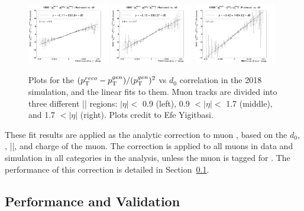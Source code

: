 \begin{figure}[!htb]
      \centering
      \includegraphics[width=0.32\textwidth]{pics/muon_corr/GeoFit/fit_results/2018_DY_eta_0_0p9_dRelPt2p0_Roch.png}
      \includegraphics[width=0.32\textwidth]{pics/muon_corr/GeoFit/fit_results/2018_DY_eta_0p9_1p7_dRelPt2p0_Roch.png}
      \includegraphics[width=0.32\textwidth]{pics/muon_corr/GeoFit/fit_results/2018_DY_eta_1p7_inf_dRelPt2p0_Roch.png}
      \caption{Plots for the $(p_{\mathrm{T}}^{reco}-p_{\mathrm{T}}^{gen})/ (p_{\mathrm{T}}^{gen})^{2}$ vs $d_0$ correlation in the 2018 \DY simulation, 
               and the linear fits to them. Muon tracks are divided into three different |\eta| regions:
               $|\eta| <$ 0.9 (left), 0.9 $< |\eta| <$ 1.7 (middle), and 1.7 $< |\eta|$ (right).
               Plots credit to Efe Yigitbasi.}
      \label{fig:geofit_param_2018}
\end{figure}

These fit results are applied as the analytic correction to muon \pt, 
based on the $d_0$, \pt, |\eta|, and charge of the muon.
The correction is applied to all muons in data and simulation in all categories in the \hmm analysis, 
unless the muon is tagged for \FSR.
The performance of this correction is detailed in Section~\ref{sec:perf_geofit}.

\subsection{Performance and Validation}\label{sec:perf_geofit}

